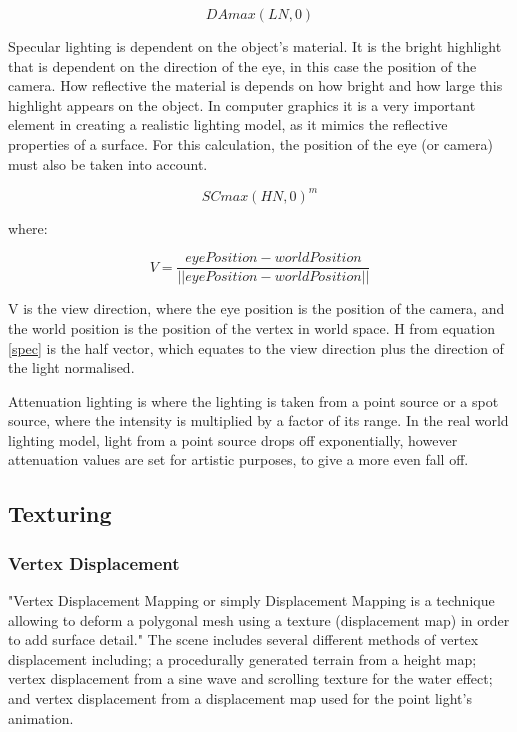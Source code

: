 \documentclass[conference]{acmsiggraph}
\begin{document}
\begin{equation} \label{diffuseLightingEq}
	DA max(L N, 0)
\end{equation}
	
Specular lighting is dependent on the object's material. It is the bright highlight that is dependent on the direction of the eye, in this case the position of the camera. How reflective the material is depends on how bright and how large this highlight appears on the object. In computer graphics it is a very important element in creating a realistic lighting model, as it mimics the reflective properties of a surface. %
For this calculation, the position of the eye (or camera) must also be taken into account. 
	
\begin{equation} \label{spec}
	SC max(H N, 0)^m
\end{equation}
	
where:
	
\begin{equation} 
	V = \frac{eyePosition - worldPosition}{||eyePosition - worldPosition||}
\end{equation}
	
V is the view direction, where the eye position is the position of the camera, and the world position is the position of the vertex in world space. H from equation \ref{spec} is the half vector, which equates to the view direction plus the direction of the light normalised.

Attenuation lighting is where the lighting is taken from a point source or a spot source, where the intensity is multiplied by a factor of its range. In the real world lighting model, light from a point source drops off exponentially, however attenuation values are set for artistic purposes, to give a more even fall off. 
	
\subsection{Texturing}

\subsubsection{Vertex Displacement}
	
"Vertex Displacement Mapping or simply Displacement Mapping is a technique allowing to deform a polygonal mesh using a texture (displacement map) in order to add surface detail." \cite{Guinot} The scene includes several different methods of vertex displacement including; a procedurally generated terrain from a height map; vertex displacement from a sine wave and scrolling texture for the water effect; and vertex displacement from a displacement map used for the point light's animation.
\end{document}
